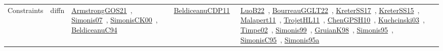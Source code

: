 {\begin{longtable}{lp{3cm}>{\raggedright\arraybackslash}p{6cm}>{\raggedright\arraybackslash}p{6cm}>{\raggedright\arraybackslash}p{8cm}}
Constraints & diffn & \href{../works/ArmstrongGOS21.pdf}{ArmstrongGOS21}~\cite{ArmstrongGOS21}, \href{../works/Simonis07.pdf}{Simonis07}~\cite{Simonis07}, \href{../works/SimonisCK00.pdf}{SimonisCK00}~\cite{SimonisCK00}, \href{../works/BeldiceanuC94.pdf}{BeldiceanuC94}~\cite{BeldiceanuC94} & \href{../works/BeldiceanuCDP11.pdf}{BeldiceanuCDP11}~\cite{BeldiceanuCDP11} & \href{../works/LuoB22.pdf}{LuoB22}~\cite{LuoB22}, \href{../works/BourreauGGLT22.pdf}{BourreauGGLT22}~\cite{BourreauGGLT22}, \href{../works/KreterSS17.pdf}{KreterSS17}~\cite{KreterSS17}, \href{../works/KreterSS15.pdf}{KreterSS15}~\cite{KreterSS15}, \href{../works/Malapert11.pdf}{Malapert11}~\cite{Malapert11}, \href{../works/TrojetHL11.pdf}{TrojetHL11}~\cite{TrojetHL11}, \href{../works/ChenGPSH10.pdf}{ChenGPSH10}~\cite{ChenGPSH10}, \href{../works/Kuchcinski03.pdf}{Kuchcinski03}~\cite{Kuchcinski03}, \href{../works/Timpe02.pdf}{Timpe02}~\cite{Timpe02}, \href{../works/Simonis99.pdf}{Simonis99}~\cite{Simonis99}, \href{../works/GruianK98.pdf}{GruianK98}~\cite{GruianK98}, \href{../works/Simonis95.pdf}{Simonis95}~\cite{Simonis95}, \href{../works/SimonisC95.pdf}{SimonisC95}~\cite{SimonisC95}, \href{../works/Simonis95a.pdf}{Simonis95a}~\cite{Simonis95a}\\

\end{longtable}}
